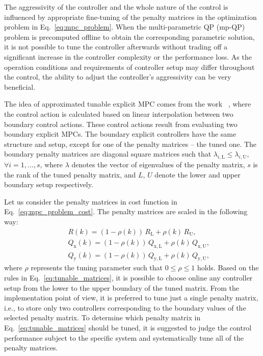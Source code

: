 \documentclass[preprint,12pt]{elsarticle}
\begin{document}
	The aggressivity of the controller and the whole nature of the control is influenced by appropriate fine-tuning of the penalty matrices in the optimization problem in Eq.~\eqref{eq:mpc_problem}. When the multi-parametric QP (mp-QP) problem is precomputed offline to obtain the corresponding parametric solution, it is not possible to tune the controller afterwards without trading off a significant increase in the controller complexity or the performance loss. As the operation conditions and requirements of controller setup may differ throughout the control, the ability to adjust the controller's aggressivity can be very beneficial.
	
	The idea of approximated tunable explicit MPC comes from the work ~\cite{Klauco_tunable}, where the control action is calculated based on linear interpolation between two boundary control actions. These control actions result from evaluating two boundary explicit MPCs. The boundary explicit controllers have the same structure and setup, except for one of the penalty matrices -- the tuned one. The boundary penalty matrices are diagonal square matrices such that $\lambda_{i,\mathrm{L}} \le \lambda_{i,\mathrm{U}}$, $\forall i = 1,\dots,s$, where $\lambda$ denotes the vector of eigenvalues of the penalty matrix, $s$ is the rank of the tuned penalty matrix, and $L$, $U$ denote the lower and upper boundary setup respectively.
	
	Let us consider the penalty matrices in cost function in Eq.~\eqref{eq:mpc_problem_cost}. The penalty matrices are scaled in the following way:
	\begin{subequations}
		\label{eq:tunable_matrices}
		\begin{eqnarray}
			\label{eq:tunable_R}
			&~& R(k) = (1-\rho(k)) \, R_\mathrm{L} + \rho(k) \, R_\mathrm{U}, \\
			\label{eq:tunable_Qx}
			&~& Q_\mathrm{x}(k) = (1-\rho(k)) \, Q_\mathrm{x,L} + \rho(k) \, Q_\mathrm{x,U}, \\
			\label{eq:tunable_Qy}
			&~& Q_\mathrm{y}(k) = (1-\rho(k)) \, Q_\mathrm{y,L} + \rho(k) \, Q_\mathrm{y,U},
		\end{eqnarray}
	\end{subequations}
	where $\rho$ represents the tuning parameter such that $0 \le \rho \le 1$ holds. Based on the rules in Eq.~\eqref{eq:tunable_matrices}, it is possible to choose online any controller setup from the lower to the upper boundary of the tuned matrix. From the implementation point of view, it is preferred to tune just a single penalty matrix, i.e., to store only two controllers corresponding to the boundary values of the selected penalty matrix. To determine which penalty matrix in Eq.~\eqref{eq:tunable_matrices} should be tuned, it is suggested to judge the control performance subject to the specific system and systematically tune all of the penalty matrices.
	
\end{document}

